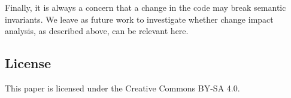 Finally, it is always a concern that a change in the code may break
semantic invariants.  We leave as future work to investigate whether change
impact analysis, as described above, can be relevant here.

\subsection{License}
This paper is licensed under the Creative Commons BY-SA 4.0.

